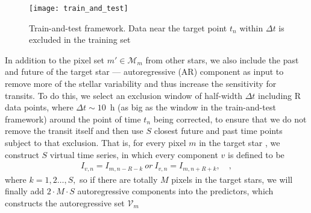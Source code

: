 \documentclass[12pt, preprint]{aastex}
\newcommand{\set}[1]{\mathcal{#1}}
\begin{document}
\begin{figure}[htb]
\centering
\texttt{[image: train\_and\_test]}
\caption{
  \label{train-and-test} 
  Train-and-test framework. 
  Data near the target point $t_{n}$ within $\Delta t$ is excluded in the training set}
\end{figure}

In addition to the pixel set $m'\in\set{M}_m$ from other stars,  
  we also include the past and future of the target star --- autoregressive (AR) component as input 
  to remove more of the stellar variability and thus increase the sensitivity for transits. 
To do this, we select an exclusion window of half-width $\Delta t$ including R data points, 
  where $\Delta t\sim 10$\, h (as big as the window in the train-and-test framework) 
  around the point of time $t_{n}$ being corrected, 
  to ensure that we do not remove the transit itself 
  and then use $S$ closest future and past time points subject to that exclusion. 
That is, for every pixel $m$ in the target star , we construct $S$ virtual time series, 
  in which every component $v$ is defined to be     
\begin{eqnarray}
I_{v,n} = I_{m,n-R-k}\ or\ I_{v,n} = I_{m,n+R+k},
\quad,
\end{eqnarray}
where $k = 1, 2\dots, S,$ so if there are totally $M$ pixels in the target stars, 
  we will finally add $2\cdot M\cdot S$
  autoregressive components into the predictors, which constructs the autoregressive set $\set{V}_m$
\end{document}
